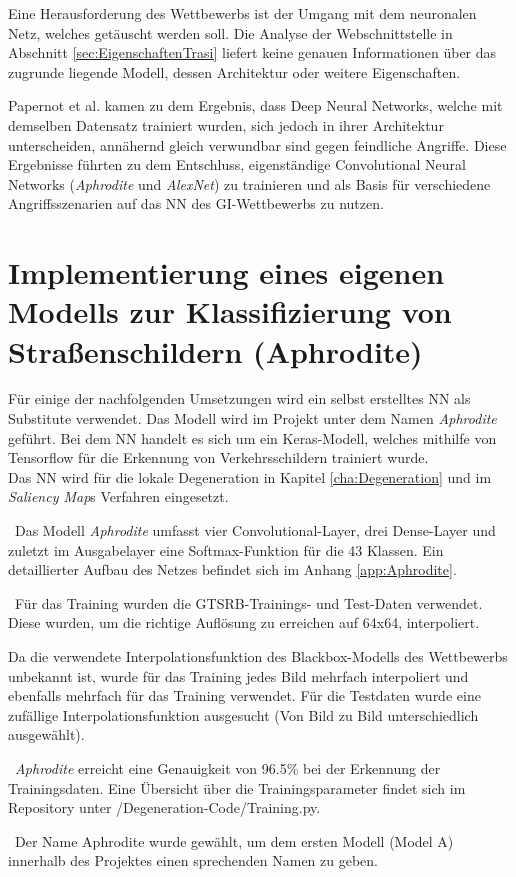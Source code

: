 \label{sec:TrasiModell}
Eine Herausforderung des Wettbewerbs ist der Umgang mit dem neuronalen Netz, welches getäuscht werden soll. 
Die Analyse der Webschnittstelle in Abschnitt \ref{sec:EigenschaftenTrasi} liefert keine genauen Informationen über das zugrunde liegende Modell, dessen Architektur oder weitere Eigenschaften.

Papernot et al. \cite{papernot_+_2016} kamen zu dem Ergebnis, dass Deep Neural Networks, welche mit demselben Datensatz trainiert wurden, sich jedoch in ihrer Architektur unterscheiden, annähernd gleich verwundbar sind gegen feindliche Angriffe.
Diese Ergebnisse führten zu dem Entschluss, eigenständige Convolutional Neural Networks (\textit{Aphrodite} und \textit{AlexNet}) zu trainieren und als Basis für verschiedene Angriffsszenarien auf das \ac{NN} des \ac{GI}-Wettbewerbs zu nutzen.

\section{Implementierung eines eigenen Modells zur Klassifizierung von Straßenschildern (Aphrodite)}
\label{sec:ImplAphrodite}
Für einige der nachfolgenden Umsetzungen wird ein selbst erstelltes \ac{NN} als Substitute verwendet. 
Das Modell wird im Projekt unter dem Namen \textit{Aphrodite} geführt. 
Bei dem \ac{NN} handelt es sich um ein Keras-Modell, welches mithilfe von Tensorflow für die Erkennung von Verkehrsschildern trainiert wurde. \\
Das \ac{NN} wird für die lokale Degeneration in Kapitel \ref{cha:Degeneration} und im \textit{Saliency Map}s Verfahren eingesetzt.

~\newline Das Modell \textit{Aphrodite} umfasst vier Convolutional-Layer, drei Dense-Layer und zuletzt im Ausgabelayer eine Softmax-Funktion für die 43 Klassen. 
Ein detaillierter Aufbau des Netzes befindet sich im Anhang \ref{app:Aphrodite}.

~\newline Für das Training wurden die \ac{GTSRB}-Trainings- und Test-Daten verwendet. 
Diese wurden, um die richtige Auflösung zu erreichen auf 64x64, interpoliert. 

Da die verwendete Interpolationsfunktion des Blackbox-Modells des Wettbewerbs unbekannt ist, wurde für das Training jedes Bild mehrfach interpoliert und ebenfalls mehrfach für das Training verwendet. 
Für die Testdaten wurde eine zufällige Interpolationsfunktion ausgesucht (Von Bild zu Bild unterschiedlich ausgewählt).

~\newline \textit{Aphrodite} erreicht eine Genauigkeit von 96.5\% bei der Erkennung der Trainingsdaten. 
Eine Übersicht über die Trainingsparameter findet sich im Repository unter /Degeneration-Code/Training.py. 

~\newline Der Name Aphrodite wurde gewählt, um dem ersten Modell (Model A) innerhalb des Projektes einen sprechenden Namen zu geben.